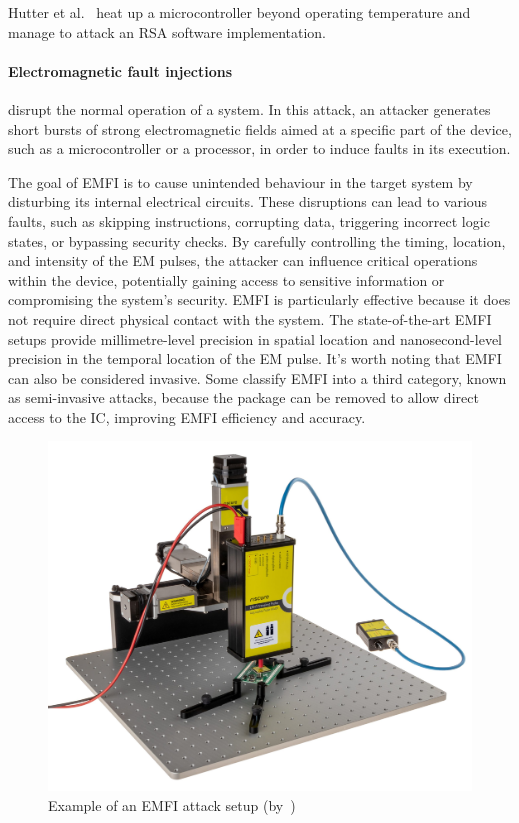 Hutter et al.~\cite{HS-14-cardis} heat up a microcontroller beyond operating temperature and manage to attack an RSA software implementation.

\paragraph{Electromagnetic fault injections} disrupt the normal operation of a system. In this attack, an attacker generates short bursts of strong electromagnetic fields aimed at a specific part of the device, such as a microcontroller or a processor, in order to induce faults in its execution.

The goal of EMFI is to cause unintended behaviour in the target system by disturbing its internal electrical circuits. These disruptions can lead to various faults, such as skipping instructions, corrupting data, triggering incorrect logic states, or bypassing security checks. By carefully controlling the timing, location, and intensity of the EM pulses, the attacker can influence critical operations within the device, potentially gaining access to sensitive information or compromising the system's security.
EMFI is particularly effective because it does not require direct physical contact with the system. The state-of-the-art EMFI setups provide millimetre-level precision in spatial location and nanosecond-level precision in the temporal location of the EM pulse.
It's worth noting that EMFI can also be considered invasive. Some classify EMFI into a third category, known as semi-invasive attacks, because the package can be removed to allow direct access to the IC, improving EMFI efficiency and accuracy.

\begin{figure}[ht]
    \centering
    \includegraphics[width=.5\textwidth]{c2_soa/img/emfi_riscure_setup.jpg}
    \caption{Example of an EMFI attack setup (by~\cite{riscure_emfi})}
    \label{fig:emfi_setup}
\end{figure}

